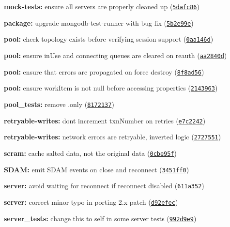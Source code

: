\begin{DoxyItemize}
\item {\bfseries mock-\/tests\+:} ensure all servers are properly cleaned up (\href{https://github.com/christkv/mongodb-core/commit/5dafc86}{\tt 5dafc86})
\item {\bfseries package\+:} upgrade mongodb-\/test-\/runner with bug fix (\href{https://github.com/christkv/mongodb-core/commit/5b2e99e}{\tt 5b2e99e})
\item {\bfseries pool\+:} check topology exists before verifying session support (\href{https://github.com/christkv/mongodb-core/commit/0aa146d}{\tt 0aa146d})
\item {\bfseries pool\+:} ensure in\+Use and connecting queues are cleared on reauth (\href{https://github.com/christkv/mongodb-core/commit/aa2840d}{\tt aa2840d})
\item {\bfseries pool\+:} ensure that errors are propagated on force destroy (\href{https://github.com/christkv/mongodb-core/commit/8f8ad56}{\tt 8f8ad56})
\item {\bfseries pool\+:} ensure work\+Item is not null before accessing properties (\href{https://github.com/christkv/mongodb-core/commit/2143963}{\tt 2143963})
\item {\bfseries pool\+\_\+tests\+:} remove .only (\href{https://github.com/christkv/mongodb-core/commit/8172137}{\tt 8172137})
\item {\bfseries retryable-\/writes\+:} don\textquotesingle{}t increment {\ttfamily txn\+Number} on retries (\href{https://github.com/christkv/mongodb-core/commit/e7c2242}{\tt e7c2242})
\item {\bfseries retryable-\/writes\+:} network errors are retryable, inverted logic (\href{https://github.com/christkv/mongodb-core/commit/2727551}{\tt 2727551})
\item {\bfseries scram\+:} cache salted data, not the original data (\href{https://github.com/christkv/mongodb-core/commit/0cbe95f}{\tt 0cbe95f})
\item {\bfseries S\+D\+AM\+:} emit S\+D\+AM events on close and reconnect (\href{https://github.com/christkv/mongodb-core/commit/3451ff0}{\tt 3451ff0})
\item {\bfseries server\+:} avoid waiting for reconnect if reconnect disabled (\href{https://github.com/christkv/mongodb-core/commit/611a352}{\tt 611a352})
\item {\bfseries server\+:} correct minor typo in porting 2.\+x patch (\href{https://github.com/christkv/mongodb-core/commit/d92efec}{\tt d92efec})
\item {\bfseries server\+\_\+tests\+:} change \textquotesingle{}this\textquotesingle{} to \textquotesingle{}self\textquotesingle{} in some server tests (\href{https://github.com/christkv/mongodb-core/commit/992d9e9}{\tt 992d9e9})

\end{DoxyItemize}

